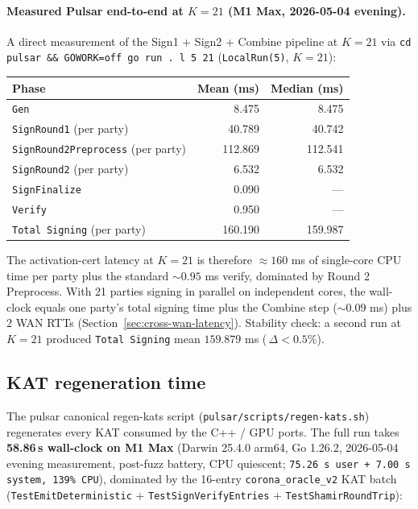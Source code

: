 \paragraph{Measured Pulsar end-to-end at $K=21$ (M1 Max, 2026-05-04 evening).}
A direct measurement of the Sign1 + Sign2 + Combine pipeline at $K = 21$
via \texttt{cd pulsar \&\& GOWORK=off go run . l 5 21}
(\texttt{LocalRun(5)}, $K = 21$):

\begin{center}
\begin{tabular}{@{}lrr@{}}
  \toprule
  \textbf{Phase} & \textbf{Mean (ms)} & \textbf{Median (ms)} \\
  \midrule
  \texttt{Gen}                              & 8.475   & 8.475   \\
  \texttt{SignRound1} (per party)           & 40.789  & 40.742  \\
  \texttt{SignRound2Preprocess} (per party) & 112.869 & 112.541 \\
  \texttt{SignRound2}  (per party)          & 6.532   & 6.532   \\
  \texttt{SignFinalize}                     & 0.090   & ---     \\
  \texttt{Verify}                           & 0.950   & ---     \\
  \texttt{Total Signing} (per party)        & 160.190 & 159.987 \\
  \bottomrule
\end{tabular}
\end{center}

The activation-cert latency at $K = 21$ is therefore $\approx 160$ ms
of single-core CPU time per party plus the standard $\sim 0.95$ ms
verify, dominated by Round 2 Preprocess. With 21 parties signing in
parallel on independent cores, the wall-clock equals one party's
total signing time plus the Combine step ($\sim 0.09$ ms) plus 2 WAN
RTTs (Section~\ref{sec:cross-wan-latency}). Stability check: a
second run at $K=21$ produced \texttt{Total Signing} mean $159.879$ ms
(\,$\Delta < 0.5\%$).

\subsection{KAT regeneration time}

The pulsar canonical regen-kats script (\texttt{pulsar/scripts/regen-kats.sh}) regenerates every KAT consumed by the C++ / GPU ports. The full run takes \textbf{58.86\,s wall-clock on M1 Max} (Darwin 25.4.0 arm64, Go 1.26.2, 2026-05-04 evening measurement, post-fuzz battery, CPU quiescent; \texttt{75.26\,s user + 7.00\,s system, 139\% CPU}), dominated by the 16-entry \texttt{corona\_oracle\_v2} KAT batch (\texttt{TestEmitDeterministic} + \texttt{TestSignVerifyEntries} + \texttt{TestShamirRoundTrip}):


